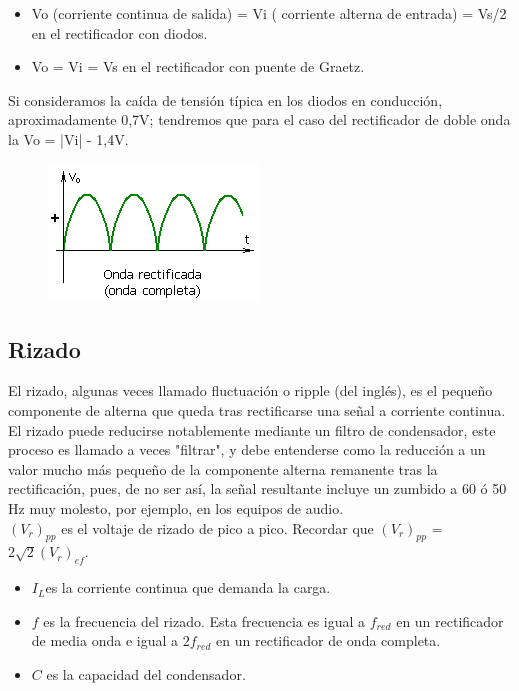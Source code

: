 \documentclass{article}
\begin{document}
\begin{itemize}
    \item  Vo (corriente continua de salida) = Vi ( corriente alterna de entrada) = Vs/2 en el rectificador con diodos.
    \item  Vo = Vi = Vs en el rectificador con puente de Graetz.
\end{itemize}

   

Si consideramos la caída de tensión típica en los diodos en conducción, aproximadamente 0,7V; tendremos que para el caso del rectificador de doble onda la Vo = |Vi| - 1,4V.\citep{circuitoOnda}\\


\begin{figure}[h!]
    \centering
    \includegraphics[scale=0.8]{OndaCompleta.png}
    \label{fig:my_label}
\end{figure}



\subsection{Rizado}

El rizado, algunas veces llamado fluctuación o ripple (del inglés), es el pequeño componente de alterna que queda tras rectificarse una señal a corriente continua. El rizado puede reducirse notablemente mediante un filtro de condensador, este proceso es llamado a veces "filtrar", y debe entenderse como la reducción a un valor mucho más pequeño de la componente alterna remanente tras la rectificación, pues, de no ser así, la señal resultante incluye un zumbido a 60 ó 50 Hz muy molesto, por ejemplo, en los equipos de audio.\citep{Rizado}\\

$(V_r)_{pp}$ es el voltaje de rizado de pico a pico. Recordar que $(V_r)_{pp}$ = $2\sqrt{2}(V_r)_{ef}$.\\

\begin{itemize}
    \item $I_L$es la corriente continua que demanda la carga.
    \item $f$ es la frecuencia del rizado. Esta frecuencia es igual a $f_{red}$ en un rectificador de media onda e igual a $2f_{red}$ en un rectificador de onda completa.
    \item $C$ es la capacidad del condensador.
\end{itemize}
\end{document}
